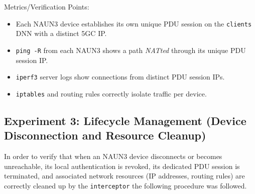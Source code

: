Metrics/Verification Points:
\begin{itemize}
    \item Each \ac{NAUN3} device establishes its own unique \ac{PDU} session on the \texttt{clients} \ac{DNN} with a distinct \ac{5GC} \ac{IP}.
    
    \item \texttt{ping -R} from each \ac{NAUN3} shows a path \textit{NATted} through its unique \ac{PDU} session \ac{IP}.
    
    \item \texttt{iperf3} server logs show connections from distinct \ac{PDU} session \acp{IP}.
    
    \item \texttt{iptables} and routing rules correctly isolate traffic per device.
\end{itemize}

\subsection{Experiment 3: Lifecycle Management (Device Disconnection and Resource Cleanup)}

In order to verify that when an \ac{NAUN3} device disconnects or becomes unreachable, its local authentication is revoked, its dedicated \ac{PDU} session is terminated, and associated network resources (\ac{IP} addresses, routing rules) are correctly cleaned up by the \texttt{interceptor} the following procedure was followed.

